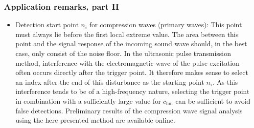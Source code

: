 \documentclass[11pt,aspectratio=169]{beamer}
\begin{document}
	\begin{frame}
		\frametitle{\appendixname{} \textendash{} Application remarks, part II}
		\begin{itemize}
			\item Detection start point $n_i$ for compression waves (primary waves): This point must always lie before the first local extreme value. The area between this point and the signal response of the incoming sound wave should, in the best case, only consist of the noise floor. In the ultrasonic pulse transmission method, interference with the electromagnetic wave of the pulse excitation often occurs directly after the trigger point. It therefore makes sense to select an index after the end of this disturbance as the starting point $n_i$. As this interference tends to be of a high-frequency nature, selecting the trigger point in combination with a sufficiently large value for $c_{\lim}$ can be sufficient to avoid false detections. Preliminary results of the compression wave signal analysis using the here presented method are available online\cite{prelimresultspaper2}.
		\end{itemize}
	\end{frame}
\end{document}
